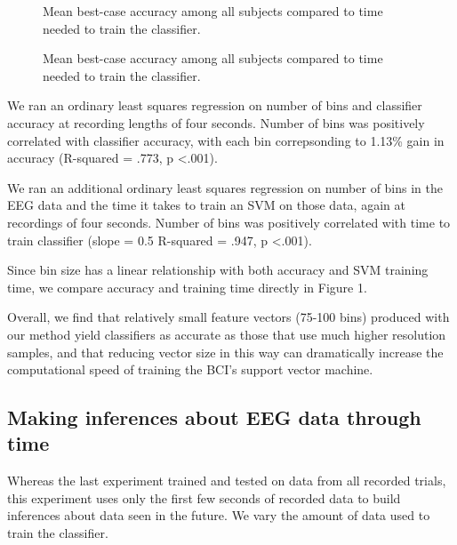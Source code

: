  \begin{figure}[!h]
  \vspace{-0.2cm}
  \centering
   {}
  \caption{Mean best-case accuracy among all subjects compared to time needed to train the classifier.}
  \label{fig:fig1b}
  \vspace{-0.1cm}
 \end{figure}

\begin{figure}[!h]
  \vspace{-0.2cm}
  \centering
   {}
  \caption{Mean best-case accuracy among all subjects compared to time needed to train the classifier.}
  \label{fig:fig1c}
  \vspace{-0.1cm}
 \end{figure}

We ran an ordinary least squares regression on number of bins and classifier accuracy at recording lengths of four seconds. Number of bins was positively correlated with classifier accuracy, with each bin correpsonding to 1.13\% gain in accuracy (R-squared = .773, p \textless .001). 

We ran an additional ordinary least squares regression on number of bins in the EEG data and the time it takes to train an SVM on those data, again at recordings of four seconds. Number of bins was positively correlated with time to train classifier (slope = 0.5 R-squared = .947, p \textless .001).

Since bin size has a linear relationship with both accuracy and SVM training time, we compare accuracy and training time directly in Figure 1. 

Overall, we find that relatively small feature vectors (75-100 bins) produced with our method yield classifiers as accurate as those that use much higher resolution samples, and that reducing vector size in this way can dramatically increase the computational speed of training the BCI's support vector machine. 

\subsection{Making inferences about EEG data through time}

Whereas the last experiment trained and tested on data from all recorded trials, this experiment uses only the first few seconds of recorded data to build inferences about data seen in the future. We vary the amount of data used to train the classifier. 

